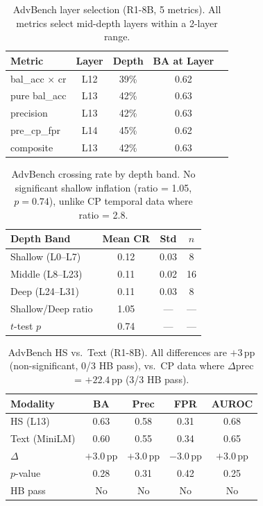 \documentclass[11pt]{article}
\newcommand{\pp}{\,\text{pp}}
\begin{document}
\begin{table}[t]
\centering
\small
\begin{tabular}{@{}lcccc@{}}
\toprule
\textbf{Metric} & \textbf{Layer} & \textbf{Depth} & \textbf{BA at Layer} \\
\midrule
bal\_acc $\times$ cr & L12 & 39\% & 0.62 \\
pure bal\_acc & L13 & 42\% & 0.63 \\
precision & L13 & 42\% & 0.63 \\
pre\_cp\_fpr & L14 & 45\% & 0.62 \\
composite & L13 & 42\% & 0.63 \\
\bottomrule
\end{tabular}
\caption{AdvBench layer selection (R1-8B, 5 metrics). All metrics select mid-depth layers within a 2-layer range.}
\label{tab:advbench_layers}
\end{table}

\begin{table}[t]
\centering
\small
\begin{tabular}{@{}lccc@{}}
\toprule
\textbf{Depth Band} & \textbf{Mean CR} & \textbf{Std} & \textbf{$n$} \\
\midrule
Shallow (L0--L7) & 0.12 & 0.03 & 8 \\
Middle (L8--L23) & 0.11 & 0.02 & 16 \\
Deep (L24--L31) & 0.11 & 0.03 & 8 \\
\midrule
Shallow/Deep ratio & 1.05 & --- & --- \\
$t$-test $p$ & 0.74 & --- & --- \\
\bottomrule
\end{tabular}
\caption{AdvBench crossing rate by depth band. No significant shallow inflation (ratio = 1.05, $p = 0.74$), unlike CP temporal data where ratio = 2.8.}
\label{tab:advbench_cr}
\end{table}

\begin{table}[t]
\centering
\small
\begin{tabular}{@{}lcccc@{}}
\toprule
\textbf{Modality} & \textbf{BA} & \textbf{Prec} & \textbf{FPR} & \textbf{AUROC} \\
\midrule
HS (L13) & 0.63 & 0.58 & 0.31 & 0.68 \\
Text (MiniLM) & 0.60 & 0.55 & 0.34 & 0.65 \\
$\Delta$ & $+3.0\pp$ & $+3.0\pp$ & $-3.0\pp$ & $+3.0\pp$ \\
$p$-value & 0.28 & 0.31 & 0.42 & 0.25 \\
HB pass & No & No & No & No \\
\bottomrule
\end{tabular}
\caption{AdvBench HS vs.\ Text (R1-8B). All differences are $+3\pp$ (non-significant, 0/3 HB pass), vs.\ CP data where $\Delta$prec = $+22.4\pp$ (3/3 HB pass).}
\label{tab:advbench_hs_text}
\end{table}
\end{document}
